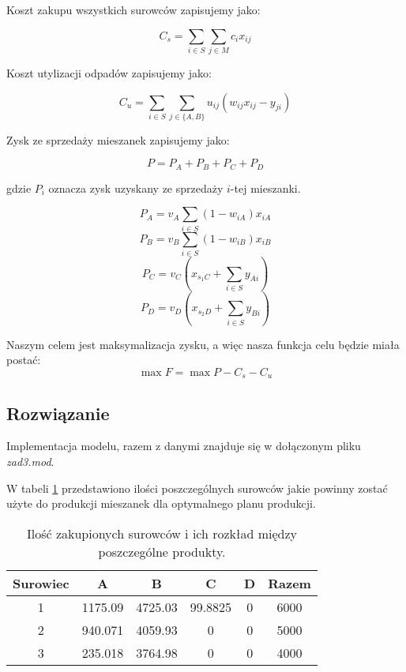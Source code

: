 \documentclass{article}
\begin{document}
        Koszt zakupu wszystkich surowców zapisujemy jako:

        $$C_s = \sum_{i \in S} \sum_{j \in M} c_i x_{ij}$$

        Koszt utylizacji odpadów zapisujemy jako:

        $$C_u = \sum_{i \in S} \sum_{j \in \{A, B\}} u_{ij} (w_{ij} x_{ij} - y_{ji})$$

        Zysk ze sprzedaży mieszanek zapisujemy jako:

        $$P = P_A + P_B + P_C + P_D$$

        gdzie $P_i$ oznacza zysk uzyskany ze sprzedaży $i$-tej mieszanki.

        $$P_A = v_A \sum_{i \in S} (1-w_{iA}) x_{iA}$$
        $$P_B = v_B \sum_{i \in S} (1-w_{iB}) x_{iB}$$
        $$P_C = v_C (x_{s_{1}C} + \sum_{i \in S} y_{Ai})$$
        $$P_D = v_D (x_{s_{2}D} + \sum_{i \in S} y_{Bi})$$

        Naszym celem jest maksymalizacja zysku, a więc nasza funkcja celu będzie miała postać:
        $$\max{F} = \max{P - C_s - C_u}$$

    \subsection{Rozwiązanie}

        Implementacja modelu, razem z danymi znajduje się w dołączonym pliku \textit{zad3.mod}.
            
        W tabeli \ref{tab3} przedstawiono ilości poszczególnych surowców jakie powinny zostać użyte do produkcji mieszanek dla optymalnego planu produkcji.

        \begin{table}[H]
            \begin{center}
                \begin{tabular}{c||c|c|c|c|c}
                    \textbf{Surowiec} & \textbf{A} & \textbf{B} & \textbf{C} & \textbf{D} & \textbf{Razem} \\
                    \hline
                    1   & 1175.09   & 4725.03   & 99.8825   & 0   & 6000 \\ 
                    2   & 940.071   & 4059.93   & 0   & 0   & 5000 \\ 
                    3   & 235.018   & 3764.98   & 0   & 0   & 4000 \\
                \end{tabular}
                \caption{Ilość zakupionych surowców i ich rozkład między poszczególne produkty.}
                \label{tab3}
            \end{center}
        \end{table}	        
\end{document}
